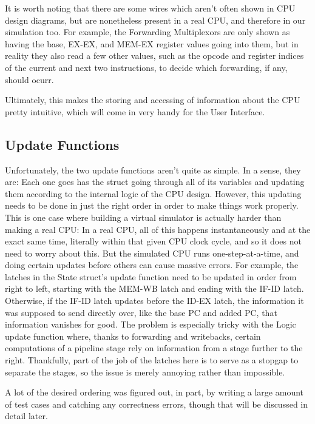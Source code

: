 \documentclass[12pt,twoside]{reedthesis}
\begin{document}
It is worth noting that there are some wires which aren't often shown in CPU design diagrams, but are nonetheless present in a real CPU, and therefore in our simulation too. For example, the Forwarding Multiplexors are only shown as having the base, EX-EX, and MEM-EX register values going into them, but in reality they also read a few other values, such as the opcode and register indices of the current and next two instructions, to decide which forwarding, if any, should ocurr.

Ultimately, this makes the storing and accessing of information about the CPU pretty intuitive, which will come in very handy for the User Interface.

\subsection{Update Functions}

Unfortunately, the two update functions aren't quite as simple. In a sense, they are: Each one goes has the struct going through all of its variables and updating them according to the internal logic of the CPU design. However, this updating needs to be done in just the right order in order to make things work properly. This is one case where building a virtual simulator is actually harder than making a real CPU: In a real CPU, all of this happens instantaneously and at the exact same time, literally within that given CPU clock cycle, and so it does not need to worry about this. But the simulated CPU runs one-step-at-a-time, and doing certain updates before others can cause massive errors. For example, the latches in the State struct's update function need to be updated in order from right to left, starting with the MEM-WB latch and ending with the IF-ID latch. Otherwise, if the IF-ID latch updates before the ID-EX latch, the information it was supposed to send directly over, like the base PC and added PC, that information vanishes for good. The problem is especially tricky with the Logic update function where, thanks to forwarding and writebacks, certain computations of a pipeline stage rely on information from a stage further to the right. Thankfully, part of the job of the latches here is to serve as a stopgap to separate the stages, so the issue is merely annoying rather than impossible.

A lot of the desired ordering was figured out, in part, by writing a large amount of test cases and catching any correctness errors, though that will be discussed in detail later.
\end{document}
